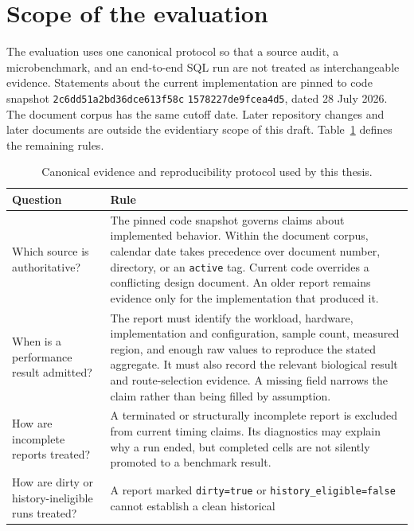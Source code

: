 \section{Scope of the evaluation}
\label{sec:solution-gap-evaluation-scope}

The evaluation uses one canonical protocol so that a source audit, a
microbenchmark, and an end-to-end SQL run are not treated as interchangeable
evidence.  Statements about the current implementation are pinned to code
snapshot
\texttt{2c6dd51a2bd36dce613f58c}\allowbreak
\texttt{1578227de9fcea4d5}, dated 28 July 2026.
The document corpus has the same cutoff date.  Later repository changes and
later documents are outside the evidentiary scope of this draft.
Table~\ref{tab:solution-evaluation-protocol} defines the remaining rules.

\begin{table}[H]
  \centering
  \scriptsize
  \setlength{\tabcolsep}{4pt}
  \renewcommand{\arraystretch}{0.96}
  \caption{Canonical evidence and reproducibility protocol used by this
  thesis.}
  \label{tab:solution-evaluation-protocol}
  \begin{tabularx}{\linewidth}{p{.23\linewidth}X}
    \toprule
    Question & Rule \\
    \midrule
    Which source is authoritative? &
    The pinned code snapshot governs claims about implemented behavior.
    Within the document corpus, calendar date takes precedence over document
    number, directory, or an \texttt{active} tag. Current code overrides a
    conflicting design document. An older report remains evidence only for
    the implementation that produced it. \\
    When is a performance result admitted? &
    The report must identify the workload, hardware, implementation and
    configuration, sample count, measured region, and enough raw values to
    reproduce the stated aggregate. It must also record the relevant
    biological result and route-selection evidence. A missing field narrows
    the claim rather than being filled by assumption. \\
    How are incomplete reports treated? &
    A terminated or structurally incomplete report is excluded from current
    timing claims. Its diagnostics may explain why a run ended, but completed
    cells are not silently promoted to a benchmark result. \\
    How are dirty or history-ineligible runs treated? &
    A report marked \texttt{dirty=true} or
    \texttt{history\_eligible=false} cannot establish a clean historical

\end{tabularx}
\end{table}
